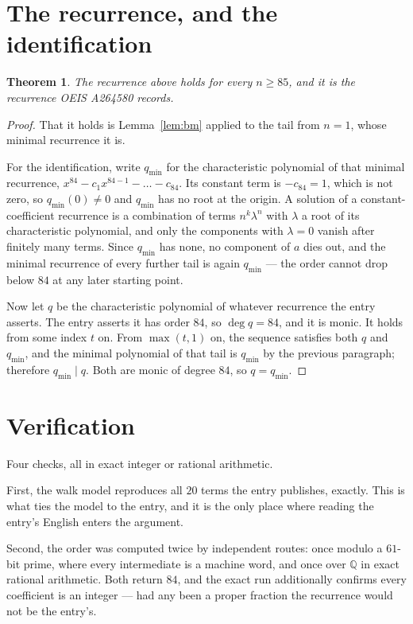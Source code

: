 \documentclass[11pt,a4paper]{article}
\theoremstyle{plain}
\newtheorem{theorem}{Theorem}
\theoremstyle{definition}
\begin{document}
\section{The recurrence, and the identification}

\begin{theorem}
The recurrence above holds for every $n\ge85$, and it is the recurrence OEIS A264580 records.
\end{theorem}

\begin{proof}
That it holds is Lemma~\ref{lem:bm} applied to the tail from $n=1$, whose minimal
recurrence it is.

For the identification, write $q_{\min}$ for the characteristic polynomial of that minimal
recurrence, $x^{84}-c_1x^{84-1}-\dots-c_{84}$. Its constant term is
$-c_{84}=1$, which is not zero, so $q_{\min}(0)\neq0$ and $q_{\min}$ has no
root at the origin. A solution of a constant-coefficient recurrence is a combination of terms
$n^{k}\lambda^{n}$ with $\lambda$ a root of its characteristic polynomial, and only the
components with $\lambda=0$ vanish after finitely many terms. Since $q_{\min}$ has none, no
component of $a$ dies out, and the minimal recurrence of every further tail is again
$q_{\min}$ --- the order cannot drop below $84$ at any later starting point.

Now let $q$ be the characteristic polynomial of whatever recurrence the entry asserts. The
entry asserts it has order $84$, so $\deg q=84$, and it is monic. It holds from some
index $t$ on. From $\max(t,1)$ on, the sequence satisfies both $q$ and $q_{\min}$, and
the minimal polynomial of that tail is $q_{\min}$ by the previous paragraph; therefore
$q_{\min}\mid q$. Both are monic of degree $84$, so $q=q_{\min}$.
\end{proof}

\section{Verification}

Four checks, all in exact integer or rational arithmetic.

First, the walk model reproduces all $20$ terms the entry publishes, exactly. This is
what ties the model to the entry, and it is the only place where reading the entry's English
enters the argument.

Second, the order was computed twice by independent routes: once modulo a $61$-bit prime, where
every intermediate is a machine word, and once over $\mathbb{Q}$ in exact rational arithmetic.
Both return $84$, and the exact run additionally confirms every coefficient is an integer
--- had any been a proper fraction the recurrence would not be the entry's.
\end{document}
